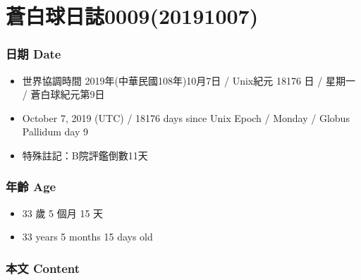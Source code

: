 \documentclass[a5paper, 12pt
]{book}
\providecommand{\tightlist}{%
  \setlength{\itemsep}{0pt}\setlength{\parskip}{0pt}}
\begin{document}
\hypertarget{ux84bcux767dux7403ux65e5ux8a8c000920191007}{%
\section{蒼白球日誌0009(20191007)}\label{ux84bcux767dux7403ux65e5ux8a8c000920191007}}

\hypertarget{ux65e5ux671f-date-8}{%
\subsubsection{日期 Date}\label{ux65e5ux671f-date-8}}

\begin{itemize}
\tightlist
\item
  世界協調時間 2019年(中華民國108年)10月7日 / Unix紀元 18176 日 / 星期一
  / 蒼白球紀元第9日
\item
  October 7, 2019 (UTC) / 18176 days since Unix Epoch / Monday / Globus
  Pallidum day 9
\item
  特殊註記：B院評鑑倒數11天
\end{itemize}

\hypertarget{ux5e74ux9f61-age-8}{%
\subsubsection{年齡 Age}\label{ux5e74ux9f61-age-8}}

\begin{itemize}
\tightlist
\item
  33 歲 5 個月 15 天
\item
  33 years 5 months 15 days old
\end{itemize}

\hypertarget{ux672cux6587-content-8}{%
\subsubsection{本文 Content}\label{ux672cux6587-content-8}}
\end{document}
